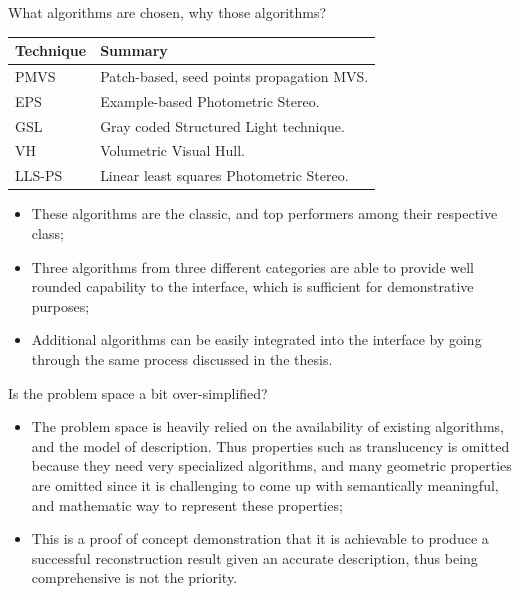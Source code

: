 \documentclass[10pt]{beamer}
\begin{document}
\begin{frame}

\begin{alertblock}{What algorithms are chosen, why those algorithms?}

\begin{table}
\centering
\begin{tabular}{l|l}
\toprule
Technique & Summary\\
\midrule
PMVS & Patch-based, seed points propagation MVS.\\
EPS & Example-based Photometric Stereo.\\
GSL & Gray coded Structured Light technique.\\
\midrule
VH & Volumetric Visual Hull.\\
LLS-PS & Linear least squares Photometric Stereo.\\
\bottomrule
\end{tabular}
\end{table}

\begin{itemize}
\item These algorithms are the classic, and top performers among their respective class;
\item Three algorithms from three different categories are able to provide well rounded capability to the interface, which is sufficient for demonstrative purposes;
\item Additional algorithms can be easily integrated into the interface by going through the same process discussed in the thesis.
\end{itemize}
\end{alertblock}

\end{frame}

\begin{frame}

\begin{alertblock}{Is the problem space a bit over-simplified?}
\begin{itemize}
\item The problem space is heavily relied on the availability of existing algorithms, and the model of description. Thus properties such as translucency is omitted because they need very specialized algorithms, and many geometric properties are omitted since it is challenging to come up with semantically meaningful, and mathematic way to represent these properties;
\item This is a proof of concept demonstration that it is achievable to produce a successful reconstruction result given an accurate description, thus being comprehensive is not the priority.
\end{itemize}
\end{alertblock}

\end{frame}
\end{document}
